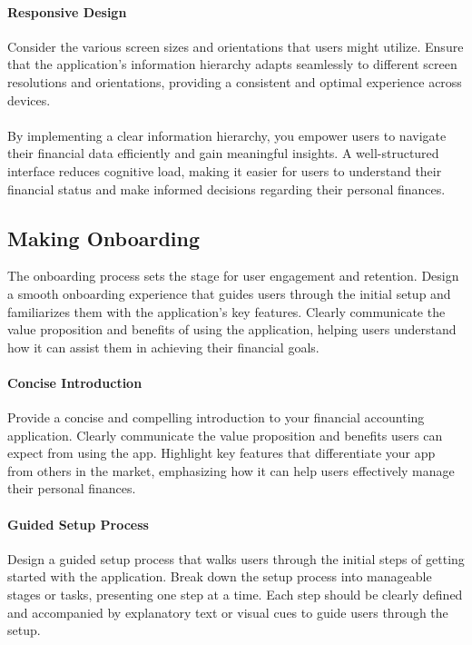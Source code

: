 \paragraph{Responsive Design}
Consider the various screen sizes and orientations that users might utilize. Ensure that the 
application's information hierarchy adapts seamlessly to different screen resolutions and orientations, providing a 
consistent and optimal experience across devices.\\
\\

By implementing a clear information hierarchy, you empower users to navigate their financial data efficiently and gain 
meaningful insights. A well-structured interface reduces cognitive load, making it easier for users to understand 
their financial status and make informed decisions regarding their personal finances.


\subsection{Making Onboarding}

The onboarding process sets the stage for user engagement and retention. Design a smooth onboarding experience that 
guides users through the initial setup and familiarizes them with the application's key features. Clearly communicate 
the value proposition and benefits of using the application, helping users understand how it can assist them in 
achieving their financial goals.

\paragraph{Concise Introduction}
Provide a concise and compelling introduction to your financial accounting application. Clearly 
communicate the value proposition and benefits users can expect from using the app. Highlight key features that 
differentiate your app from others in the market, emphasizing how it can help users effectively manage their personal 
finances.

\paragraph{Guided Setup Process}
Design a guided setup process that walks users through the initial steps of getting started with 
the application. Break down the setup process into manageable stages or tasks, presenting one step at a time. Each 
step should be clearly defined and accompanied by explanatory text or visual cues to guide users through the setup.


